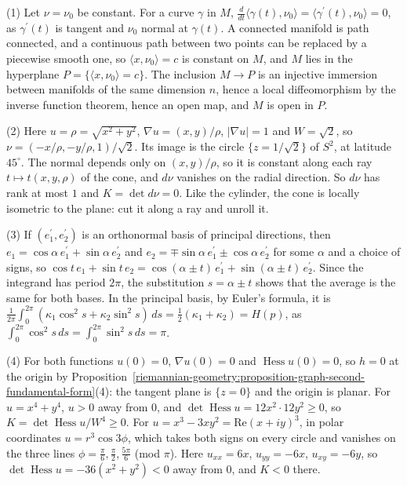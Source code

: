 \begin{solution}
(1) Let $\nu = \nu_0$ be constant. For a curve $\gamma$ in $M$, $\frac{d}{dt}\langle\gamma(t), \nu_0\rangle = \langle\gamma^{\prime}(t), \nu_0\rangle = 0$, as $\gamma^{\prime}(t)$ is tangent and $\nu_0$ normal at
$\gamma(t)$. A connected manifold is path connected, and a continuous path between two points can be replaced by a piecewise smooth one, so $\langle x, \nu_0\rangle = c$ is constant on $M$, and $M$ lies in the
hyperplane $P = \{\langle x, \nu_0\rangle = c\}$. The inclusion $M \to P$ is an injective immersion between manifolds of the same dimension $n$, hence a local diffeomorphism by the inverse function theorem,
hence an open map, and $M$ is open in $P$.

(2) Here $u = \rho = \sqrt{x^2 + y^2}$, $\nabla u = (x, y)/\rho$, $|\nabla u| = 1$ and $W = \sqrt2$, so $\nu = (-x/\rho, -y/\rho, 1)/\sqrt2$. Its image is the circle $\{z = 1/\sqrt2\}$ of $S^2$, at latitude
$45^\circ$. The normal depends only on $(x, y)/\rho$, so it is constant along each ray $t \mapsto t(x, y, \rho)$ of the cone, and $d\nu$ vanishes on the radial direction. So $d\nu$ has rank at most $1$ and
$K = \det d\nu = 0$. Like the cylinder, the cone is locally isometric to the plane: cut it along a ray and unroll it.

(3) If $(e_1^{\prime}, e_2^{\prime})$ is an orthonormal basis of principal directions, then $e_1 = \cos\alpha\,e_1^{\prime} + \sin\alpha\,e_2^{\prime}$ and $e_2 = \mp\sin\alpha\,e_1^{\prime} \pm \cos\alpha\,e_2^{\prime}$ for some
$\alpha$ and a choice of signs, so $\cos t\,e_1 + \sin t\,e_2 = \cos(\alpha \pm t)\,e_1^{\prime} + \sin(\alpha \pm t)\,e_2^{\prime}$. Since the integrand has period $2\pi$, the substitution $s = \alpha \pm t$ shows
that the average is the same for both bases. In the principal basis, by Euler's formula, it is $\frac{1}{2\pi}\int_0^{2\pi}(\kappa_1\cos^2s + \kappa_2\sin^2s)\,ds = \frac12(\kappa_1 + \kappa_2) = H(p)$, as
$\int_0^{2\pi}\cos^2s\,ds = \int_0^{2\pi}\sin^2s\,ds = \pi$.

(4) For both functions $u(0) = 0$, $\nabla u(0) = 0$ and $\operatorname{Hess}u(0) = 0$, so $h = 0$ at the origin by Proposition~\ref{riemannian-geometry:proposition-graph-second-fundamental-form}(4): the
tangent plane is $\{z = 0\}$ and the origin is planar. For $u = x^4 + y^4$, $u > 0$ away from $0$, and $\det\operatorname{Hess}u = 12x^2 \cdot 12y^2 \geq 0$, so $K = \det\operatorname{Hess}u/W^4 \geq 0$. For
$u = x^3 - 3xy^2 = \mathrm{Re}(x + iy)^3$, in polar coordinates $u = r^3\cos3\phi$, which takes both signs on every circle and vanishes on the three lines $\phi = \frac\pi6, \frac\pi2, \frac{5\pi}6$ (mod $\pi$).
Here $u_{xx} = 6x$, $u_{yy} = -6x$, $u_{xy} = -6y$, so $\det\operatorname{Hess}u = -36(x^2 + y^2) < 0$ away from $0$, and $K < 0$ there.
\end{solution}
